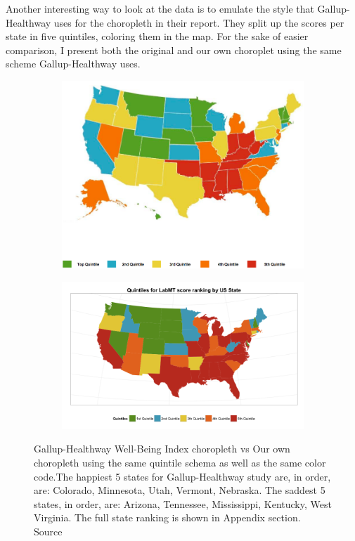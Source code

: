 \documentclass{llncs}
\begin{document}
Another interesting way to look at the data is to emulate the style that Gallup-Healthway uses for the choropleth in their report. They split up the scores per state in five quintiles, coloring them in the map. For the sake of easier comparison, I present both the original and our own choroplet using the same scheme Gallup-Healthway uses.

\begin{figure}[!ht]
\begin{subfigure}[b]{\textwidth}
\centering
\includegraphics[width=\textwidth]{images/gallup_2012}
\end{subfigure}
\begin{subfigure}[b]{\textwidth}
\includegraphics[width=\textwidth]{images/scores_by_state_gallup_style}
\end{subfigure}
\caption{Gallup-Healthway Well-Being Index choropleth vs Our own choropleth using the same quintile schema as well as the same color code.The happiest 5 states for Gallup-Healthway study are, in order, are: Colorado, Minnesota, Utah, Vermont, Nebraska. The saddest 5 states, in order, are: Arizona, Tennessee, Mississippi, Kentucky, West Virginia. The full state ranking is shown in Appendix section. Source \cite{GallupHealthway2013}}
\label{fig:gallup_vs_labmt}
\end{figure}
\end{document}
